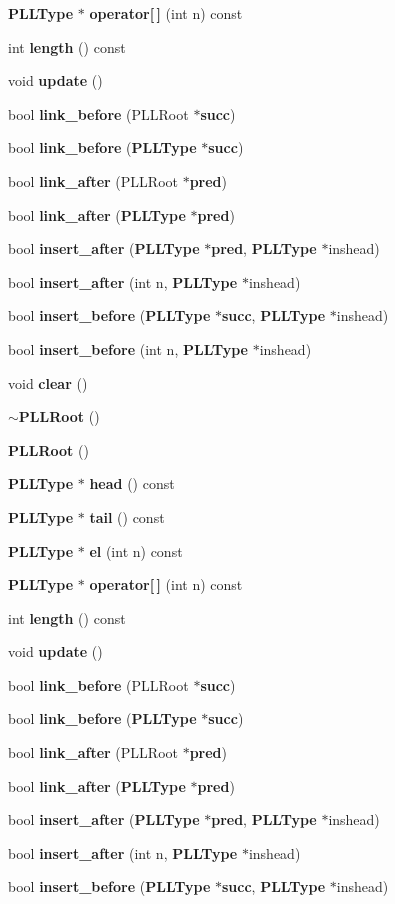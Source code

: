 \begin{CompactItemize}
\item 
{\bf PLLType} $\ast$ {\bf operator[$\,$]} (int n) const
\item 
int {\bf length} () const
\item 
void {\bf update} ()
\item 
bool {\bf link\_\-before} (PLLRoot $\ast${\bf succ})
\item 
bool {\bf link\_\-before} ({\bf PLLType} $\ast${\bf succ})
\item 
bool {\bf link\_\-after} (PLLRoot $\ast${\bf pred})
\item 
bool {\bf link\_\-after} ({\bf PLLType} $\ast${\bf pred})
\item 
bool {\bf insert\_\-after} ({\bf PLLType} $\ast${\bf pred}, {\bf PLLType} $\ast$inshead)
\item 
bool {\bf insert\_\-after} (int n, {\bf PLLType} $\ast$inshead)
\item 
bool {\bf insert\_\-before} ({\bf PLLType} $\ast${\bf succ}, {\bf PLLType} $\ast$inshead)
\item 
bool {\bf insert\_\-before} (int n, {\bf PLLType} $\ast$inshead)
\item 
void {\bf clear} ()
\item 
{\bf $\sim$PLLRoot} ()
\item 
{\bf PLLRoot} ()
\item 
{\bf PLLType} $\ast$ {\bf head} () const
\item 
{\bf PLLType} $\ast$ {\bf tail} () const
\item 
{\bf PLLType} $\ast$ {\bf el} (int n) const
\item 
{\bf PLLType} $\ast$ {\bf operator[$\,$]} (int n) const
\item 
int {\bf length} () const
\item 
void {\bf update} ()
\item 
bool {\bf link\_\-before} (PLLRoot $\ast${\bf succ})
\item 
bool {\bf link\_\-before} ({\bf PLLType} $\ast${\bf succ})
\item 
bool {\bf link\_\-after} (PLLRoot $\ast${\bf pred})
\item 
bool {\bf link\_\-after} ({\bf PLLType} $\ast${\bf pred})
\item 
bool {\bf insert\_\-after} ({\bf PLLType} $\ast${\bf pred}, {\bf PLLType} $\ast$inshead)
\item 
bool {\bf insert\_\-after} (int n, {\bf PLLType} $\ast$inshead)
\item 
bool {\bf insert\_\-before} ({\bf PLLType} $\ast${\bf succ}, {\bf PLLType} $\ast$inshead)

\end{CompactItemize}
